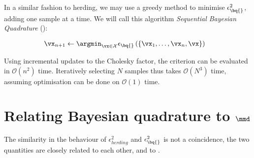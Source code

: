 In a similar fashion to herding, we may use a greedy method to minimise $\epsilon^{2}_{\bq{}}$, adding one sample at a time. We will call this algorithm \emph{Sequential Bayesian Quadrature} (\sbq{}):

\begin{align}
\vx_{n+1} &\leftarrow \argmin_{\vx \in \mathcal{X}} \epsilon_{\bq{}}\left(\{\vx_1,\ldots,\vx_{n},\vx\}\right) \label{eqn:sequential_BQ}
\end{align}

Using incremental updates to the Cholesky factor, the criterion can be evaluated in $\mathcal{O}(n^2)$ time. Iteratively selecting $N$ samples thus takes $\mathcal{O}(N^3)$ time, assuming optimisation can be done on $\mathcal{O}(1)$ time.

\section{Relating Bayesian quadrature to $\mmd$}

The similarity in the behaviour of $\epsilon^{2}_{herding}$ and $\epsilon^{2}_{\bq{}}$ is not a coincidence, the two quantities are closely related to each other, and to \mmd.

